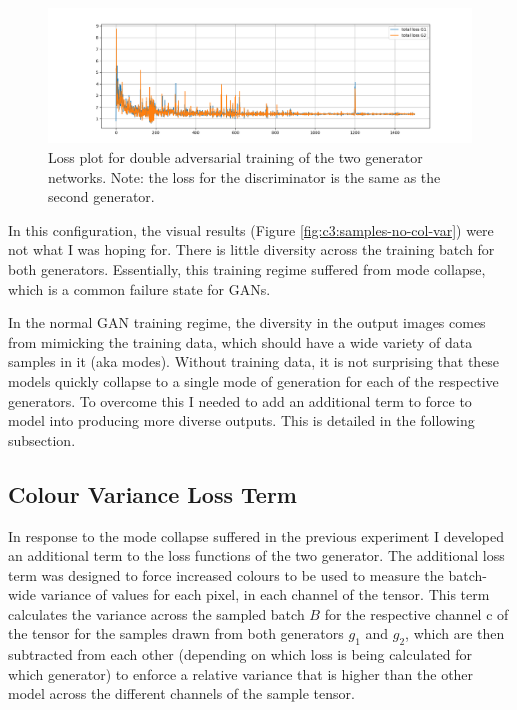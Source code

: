   \begin{figure}[!htbp]
    \centering
    \includegraphics[width=1\textwidth]{figures/c4_unstable/train_losses/no_col_var/total_loss_no_var.png}
    \caption[Loss plot for double adversarial training]{Loss plot for double adversarial training of the two generator networks. Note: the loss for the discriminator is the same as the second generator.}
  \label{fig:c3:no-var-losses}
  \end{figure}

In this configuration, the visual results (Figure \ref{fig:c3:samples-no-col-var}) were not what I was hoping for.  
There is little diversity across the training batch for both generators. 
Essentially, this training regime suffered from mode collapse, which is a common failure state for GANs.

In the normal GAN training regime, the diversity in the output images comes from mimicking the training data, which should have a wide variety of data samples in it (aka modes). 
Without training data, it is not surprising that these models quickly collapse to a single mode of generation for each of the respective generators. 
To overcome this I needed to add an additional term to force to model into producing more diverse outputs. 
This is detailed in the following subsection.

\subsection{Colour Variance Loss Term}

In response to the mode collapse suffered in the previous experiment I developed an additional term to the loss functions of the two generator.
The additional loss term was designed to force increased colours to be used to measure the batch-wide variance of values for each pixel, in each channel of the tensor. 
This term calculates the variance across the sampled batch $B$ for the respective channel c of the tensor for the samples drawn from both generators $g_{1}$ and $g_{2}$, which are then subtracted from each other (depending on which loss is being calculated for which generator) to enforce a relative variance that is higher than the other model across the different channels of the sample tensor.

